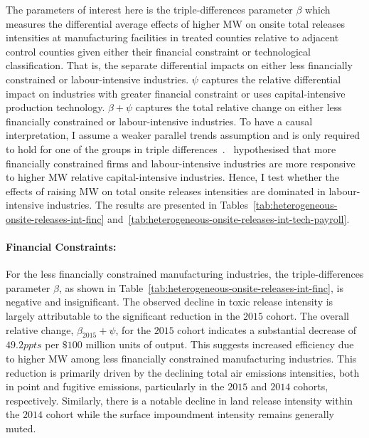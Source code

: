 \documentclass[12pt, english]{article}
\begin{document}
    The parameters of interest here is the triple-differences parameter $\beta$ which measures the differential average effects of higher MW on onsite total releases intensities at manufacturing facilities in treated counties relative to adjacent control counties given either their financial constraint or technological classification. That is, the separate differential impacts on either less financially constrained or labour-intensive industries. $\psi$ captures the relative differential impact on industries with greater financial constraint or uses capital-intensive production technology. $\beta + \psi$ captures the total relative change on either less financially constrained or labour-intensive industries. To have a causal interpretation, I assume a weaker parallel trends assumption and is only required to hold for one of the groups in triple differences~\parencite{olden2022triple}.~\cite{zhang2023unintended} hypothesised that more financially constrained firms and labour-intensive industries are more responsive to higher MW relative capital-intensive industries. Hence, I test whether the effects of raising MW on total onsite releases intensities are dominated in labour-intensive industries. The results are presented in Tables~\ref{tab:heterogeneous-onsite-releases-int-finc} and~\ref{tab:heterogeneous-onsite-releases-int-tech-payroll}.

    \paragraph{Financial Constraints:}
    For the less financially constrained manufacturing industries, the triple-differences parameter $\beta$, as shown in Table~\ref{tab:heterogeneous-onsite-releases-int-finc}, is negative and insignificant. The observed decline in toxic release intensity is largely attributable to the significant reduction in the $2015$ cohort. The overall relative change, $\beta_{2015} + \psi$, for the $2015$ cohort indicates a substantial decrease of $49.2ppts$ per $\$100$ million units of output. This suggests increased efficiency due to higher MW among less financially constrained manufacturing industries. This reduction is primarily driven by the declining total air emissions intensities, both in point and fugitive emissions, particularly in the $2015$ and $2014$ cohorts, respectively. Similarly, there is a notable decline in land release intensity within the $2014$ cohort while the surface impoundment intensity remains generally muted.
    
\end{document}
